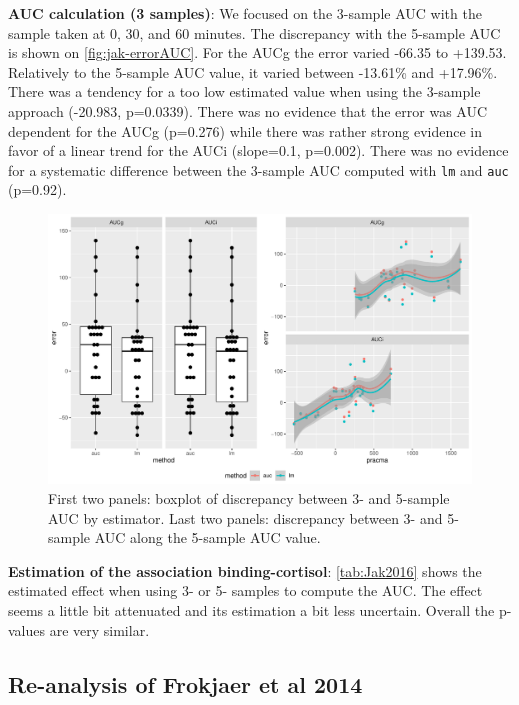 \documentclass[12pt]{article}
\begin{document}
\textbf{AUC calculation (3 samples)}: We focused on the 3-sample AUC with the
sample taken at 0, 30, and 60 minutes. The discrepancy with the
5-sample AUC is shown on \autoref{fig:jak-errorAUC}. For the AUCg the
error varied -66.35 to +139.53. Relatively to the 5-sample AUC value,
it varied between -13.61\% and +17.96\%. There was a tendency for a too
low estimated value when using the 3-sample approach (-20.983,
p=0.0339). There was no evidence that the error was AUC dependent for
the AUCg (p=0.276) while there was rather strong evidence in favor of
a linear trend for the AUCi (slope=0.1, p=0.002). There was no
evidence for a systematic difference between the 3-sample AUC computed
with \texttt{lm} and \texttt{auc} (p=0.92).

\begin{figure}[!h]
\centering
\includegraphics[width=1\textwidth]{./figures/gg-jak-errorAUC.pdf}
\caption{\label{fig:jak-errorAUC}First two panels: boxplot of discrepancy between 3- and 5-sample AUC by estimator. Last two panels: discrepancy between 3- and 5-sample AUC along the 5-sample AUC value.}
\end{figure}

\bigskip

\textbf{Estimation of the association binding-cortisol}: \autoref{tab:Jak2016} shows
the estimated effect when using 3- or 5- samples to compute the
AUC. The effect seems a little bit attenuated and its estimation a bit
less uncertain. Overall the p-values are very similar.

\subsection{Re-analysis of Frokjaer et al 2014}
\label{sec:org5c1aeb1}
\end{document}
